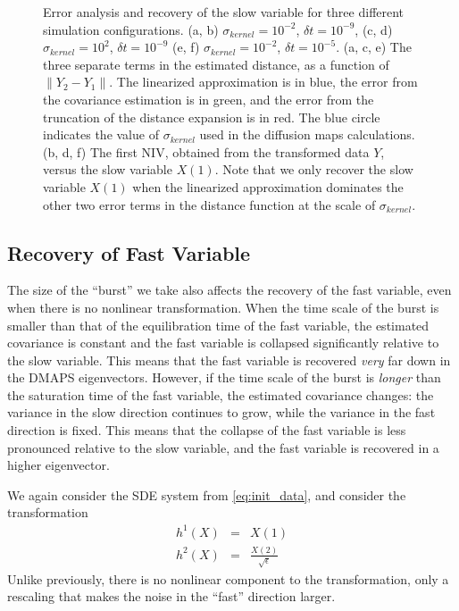 \documentclass[1p]{elsarticle}
\begin{document}
\begin{figure}
\caption{ Error analysis and recovery of the slow variable for three different simulation configurations. (a, b) $\sigma_{kernel} = 10^{-2}$, $\delta t = 10^{-9}$, (c, d) $\sigma_{kernel} = 10^{2}$, $\delta t = 10^{-9}$ (e, f) $\sigma_{kernel} = 10^{-2}$, $\delta t = 10^{-5}$.  (a, c, e) The three separate terms in the estimated distance, as a function of $\|Y_2 - Y_1\|$. The linearized approximation is in blue, the error from the covariance estimation is in green, and the error from the truncation of the distance expansion is in red. The blue circle indicates the value of $\sigma_{kernel}$ used in the diffusion maps calculations. (b, d, f) The first NIV, obtained from the transformed data $Y$, versus the slow variable $X(1)$. Note that we only recover the slow variable $X(1)$ when the linearized approximation dominates the other two error terms in the distance function at the scale of $\sigma_{kernel}$. }

\end{figure}

\subsection{Recovery of Fast Variable}

The size of the ``burst'' we take also affects the recovery of the fast variable, even when there is no nonlinear transformation.
%
When the time scale of the burst is smaller than that of the equilibration time of the fast variable, the estimated covariance is constant and the fast variable is collapsed significantly relative to the slow variable.
%
This means that the fast variable is recovered {\em very} far down in the DMAPS eigenvectors.
%
However, if the time scale of the burst is {\em longer} than the saturation time of the fast variable, the estimated covariance changes: the variance in the slow direction continues to grow, while the variance in the fast direction is fixed.
%
This means that the collapse of the fast variable is less pronounced relative to the slow variable, and the fast variable is recovered in a higher eigenvector. 

We again consider the SDE system from \eqref{eq:init_data}, and consider the transformation
\begin{eqnarray}\label{eq:transformed_data2}
h^1(X) &=& X(1)  \\
h^2(X) &=& \frac{X(2)}{\sqrt{\epsilon}}
\end{eqnarray}
%
Unlike previously, there is no nonlinear component to the transformation, only a rescaling that makes the noise in the ``fast'' direction larger. 
\end{document}
